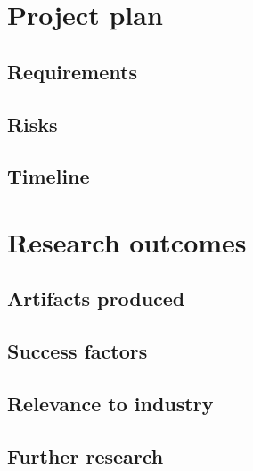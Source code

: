 \documentclass{sig-alternate-05-2015}
\begin{document}
\section{Project plan}
\subsection{Requirements}
\subsection{Risks}
\subsection{Timeline}
\section{Research outcomes}
\subsection{Artifacts produced}
\subsection{Success factors}
\subsection{Relevance to industry}
\subsection{Further research}



\end{document}
